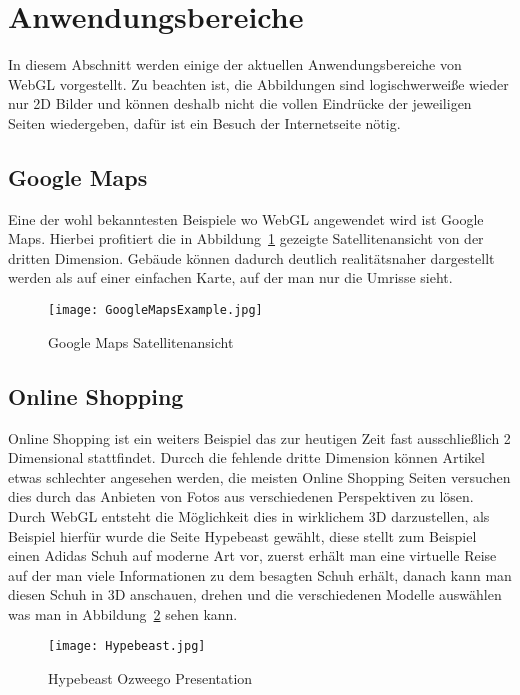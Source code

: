 \section{Anwendungsbereiche}
\label{sec:usecases}
In diesem Abschnitt werden einige der aktuellen Anwendungsbereiche von WebGL vorgestellt.
Zu beachten ist, die Abbildungen sind logischwerweiße wieder nur 2D Bilder und können deshalb nicht die vollen Eindrücke der jeweiligen Seiten wiedergeben, dafür ist ein Besuch der Internetseite nötig.
\subsection{Google Maps}
Eine der wohl bekanntesten Beispiele wo WebGL angewendet wird ist Google Maps.
Hierbei profitiert die in Abbildung~\ref{fig:GoogleMaps} gezeigte Satellitenansicht von der dritten Dimension.
Gebäude können dadurch deutlich realitätsnaher dargestellt werden als auf einer einfachen Karte, auf der man nur die Umrisse sieht.
\begin{figure}
    \centering
    \texttt{[image: GoogleMapsExample.jpg]}
    \caption{Google Maps Satellitenansicht \cite{GoogleMaps}} \label{fig:GoogleMaps}
    \end{figure}

\subsection{Online Shopping}
Online Shopping ist ein weiters Beispiel das zur heutigen Zeit fast ausschließlich 2 Dimensional stattfindet.
Durcch die fehlende dritte Dimension können Artikel etwas schlechter angesehen werden, die meisten Online Shopping Seiten versuchen dies durch das Anbieten von Fotos aus verschiedenen Perspektiven zu lösen.
Durch WebGL entsteht die Möglichkeit dies in wirklichem 3D darzustellen, als Beispiel hierfür wurde die Seite Hypebeast gewählt, diese stellt zum Beispiel einen Adidas Schuh auf moderne Art vor, zuerst erhält man eine virtuelle Reise auf der man viele Informationen zu dem besagten Schuh erhält, danach kann man diesen Schuh in 3D anschauen, drehen und die verschiedenen Modelle auswählen was man in Abbildung~\ref{fig:HypeBeast} sehen kann.
\begin{figure}
    \centering
    \texttt{[image: Hypebeast.jpg]}
    \caption{Hypebeast Ozweego Presentation \cite{hypbeast}} \label{fig:HypeBeast}
    \end{figure}

